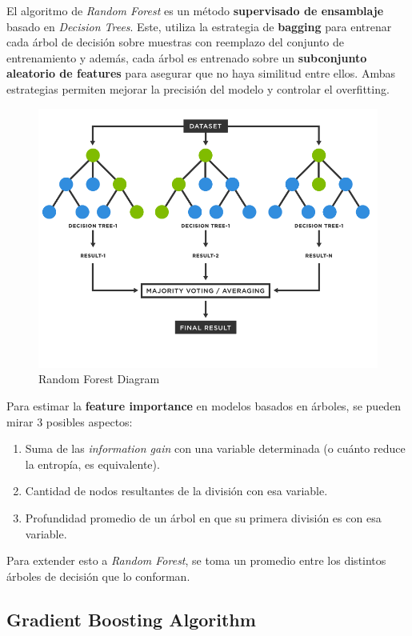 El algoritmo de \textit{Random Forest} es un método \textbf{supervisado de ensamblaje} basado en \textit{Decision Trees}. Este, utiliza la estrategia de \textbf{bagging} para entrenar cada árbol de decisión sobre muestras con reemplazo del conjunto de entrenamiento y además, cada árbol es entrenado sobre un \textbf{subconjunto aleatorio de features} para asegurar que no haya similitud entre ellos. Ambas estrategias permiten mejorar la precisión del modelo y controlar el overfitting.

\begin{figure}[H]
    \center
    \includegraphics[scale=0.25]{notebooks/ML/img/random_forest_diagram.png}
    \caption{Random Forest Diagram}
\end{figure}

Para estimar la \textbf{feature importance} en modelos basados en árboles, se pueden mirar 3 posibles aspectos: 
\begin{enumerate}
    \item Suma de las \textit{information gain} con una variable determinada (o cuánto reduce la entropía, es equivalente). 
    \item Cantidad de nodos resultantes de la división con esa variable. 
    \item Profundidad promedio de un árbol en que su primera división es con esa variable. 
\end{enumerate}

Para extender esto a \textit{Random Forest}, se toma un promedio entre los distintos árboles de decisión que lo conforman. 

\subsection{Gradient Boosting Algorithm}

